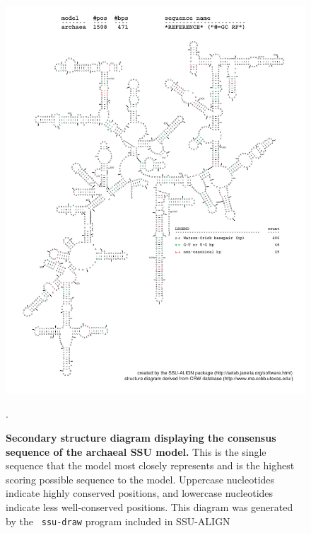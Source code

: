 \begin{figure}[hb]
\begin{center}
\includegraphics[width=5.64in]{Figures/archaea-0p1-rf}
\end{center}
\caption[Secondary structure diagram displaying the consensus sequence
  of the archaeal SSU model]{\textbf{Secondary structure diagram displaying the
  consensus sequence of the archaeal SSU model.} 
  This is the single sequence that the model 
  most closely represents and is the highest scoring possible
  sequence to the model. Uppercase nucleotides indicate highly conserved positions,
  and lowercase nucleotides indicate less well-conserved positions.
  This diagram was generated by the {\tt
  ssu-draw} program included in SSU-ALIGN}.
\label{fig:arcrf}
\end{figure}

\newpage 

